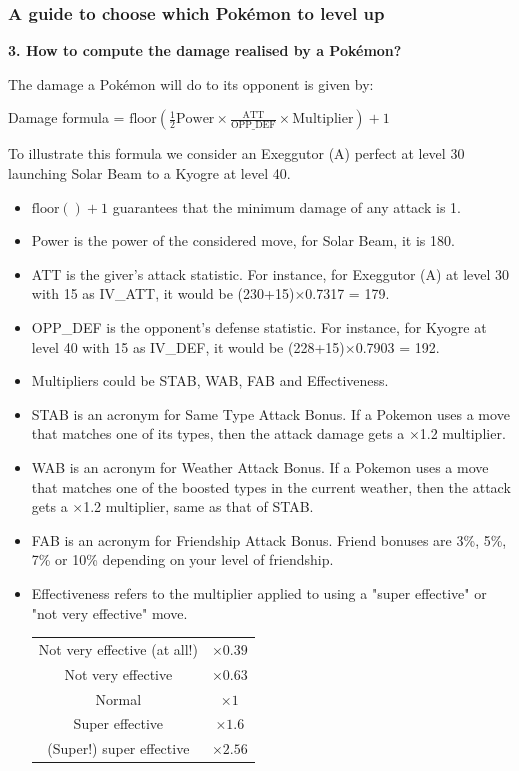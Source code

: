 \documentclass[8pt,aspectratio=169,compress]{beamer}
\begin{document}
\begin{frame}
\frametitle{A guide to choose which Pok\'emon to level up}

\begin{block}{}
\begin{tiny}

\textbf{3. How to compute the damage realised by a Pokémon?}

The damage a Pok\'emon will do to its opponent is given by:
\begin{center}
Damage formula = $\text{floor}\left(\frac{1}{2}\text{Power} \times \frac{\text{ATT}}{\text{OPP\_DEF}}\times\text{Multiplier}\right) +1$
\end{center}

To illustrate this formula we consider an Exeggutor (A) perfect at level 30 launching Solar Beam to a Kyogre at level 40.
\begin{itemize}
  \item $\text{floor}\left(\right)+1$ guarantees that the minimum damage of any attack is 1.
  \item Power is the power of the considered move, for Solar Beam, it is 180.
  \item ATT is the giver's attack statistic. For instance, for Exeggutor (A) at level 30 with 15 as IV\_ATT, it would be (230+15)$\times$0.7317 = 179.
  \item OPP\_DEF is the opponent's defense statistic. For instance, for Kyogre at level 40 with 15 as IV\_DEF, it would be (228+15)$\times$0.7903 = 192.
  \item Multipliers could be STAB, WAB, FAB and Effectiveness.
  \item STAB is an acronym for Same Type Attack Bonus. If a Pokemon uses a move that matches one of its types, then the attack damage gets a $\times$1.2 multiplier.
  \item WAB is an acronym for Weather Attack Bonus. If a Pokemon uses a move that matches one of the boosted types in the current weather, then the attack gets a $\times$1.2 multiplier, same as that of STAB.
  \item FAB is an acronym for Friendship Attack Bonus. Friend bonuses are 3\%, 5\%, 7\% or 10\% depending on your level of friendship.
  \item Effectiveness refers to the multiplier applied to using a "super effective" or "not very effective" move.  

\begin{center}
\begin{tabular}{cc}
Not very effective (at all!) & $\times 0.39$ \\
Not very effective & $\times 0.63$ \\
Normal & $\times 1$ \\
Super effective & $\times 1.6$  \\ 
(Super!) super effective & $\times 2.56$ \\
\end{tabular} 
\end{center}
\end{itemize}


\end{tiny}
\end{block}
\end{frame}
\end{document}

